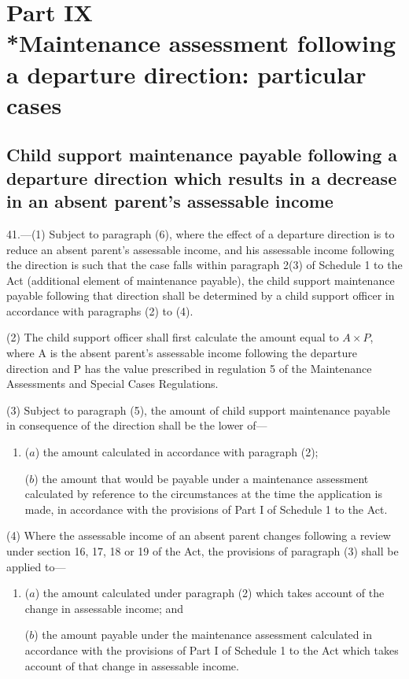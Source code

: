 \documentclass[a4paper]{article}
\newcommand{\parthead}{}
\begin{document}
\section[Part IX --- Maintenance assessment following a departure direction: particular cases]{Part IX\\*Maintenance assessment following a departure direction: particular cases}

\subsection[41. Child support maintenance payable following a departure direction which results in a decrease in an absent parent’s assessable income]{Child support maintenance payable following a departure direction which results in a decrease in an absent parent’s assessable income}

\renewcommand\parthead{--- Part IX}

41.—(1) Subject to paragraph (6), where the effect of a departure direction is to reduce an absent parent’s assessable income, and his assessable income following the direction is such that the case falls within paragraph 2(3) of Schedule 1 to the Act (additional element of maintenance payable), the child support maintenance payable following that direction shall be determined by a child support officer in accordance with paragraphs (2) to (4).

(2) The child support officer shall first calculate the amount equal to \(A\times P\), where A is the absent parent’s assessable income following the departure direction and P has the value prescribed in regulation 5 of the Maintenance Assessments and Special Cases Regulations.

(3) Subject to paragraph (5), the amount of child support maintenance payable in consequence of the direction shall be the lower of—
\begin{enumerate}\item[]
($a$) the amount calculated in accordance with paragraph (2);

($b$) the amount that would be payable under a maintenance assessment calculated by reference to the circumstances at the time the application is made, in accordance with the provisions of Part I of Schedule 1 to the Act.
\end{enumerate}

(4) Where the assessable income of an absent parent changes following a review under section 16, 17, 18 or 19 of the Act, the provisions of paragraph (3) shall be applied to—
\begin{enumerate}\item[]
($a$) the amount calculated under paragraph (2) which takes account of the change in assessable income; and

($b$) the amount payable under the maintenance assessment calculated in accordance with the provisions of Part I of Schedule 1 to the Act which takes account of that change in assessable income.
\end{enumerate}
\end{document}
